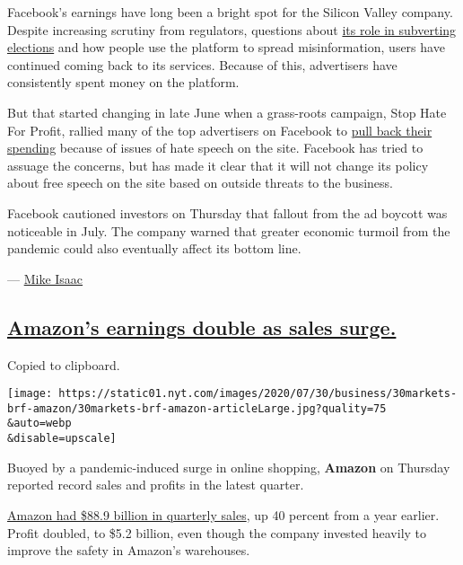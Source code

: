 Facebook's earnings have long been a bright spot for the Silicon Valley
company. Despite increasing scrutiny from regulators, questions about
\href{https://www.nytimes.com/2018/02/17/technology/indictment-russian-tech-facebook.html}{its
role in subverting elections} and how people use the platform to spread
misinformation, users have continued coming back to its services.
Because of this, advertisers have consistently spent money on the
platform.

But that started changing in late June when a grass-roots campaign, Stop
Hate For Profit, rallied many of the top advertisers on Facebook to
\href{https://www.nytimes.com/2020/06/30/technology/facebook-advertising-boycott.html}{pull
back their spending} because of issues of hate speech on the site.
Facebook has tried to assuage the concerns, but has made it clear that
it will not change its policy about free speech on the site based on
outside threats to the business.

Facebook cautioned investors on Thursday that fallout from the ad
boycott was noticeable in July. The company warned that greater economic
turmoil from the pandemic could also eventually affect its bottom line.

--- \href{https://www.nytimes.com/by/mike-isaac}{Mike Isaac}

\hypertarget{amazons-earnings-double-as-sales-surge}{%
\subsection{\texorpdfstring{\protect\hyperlink{amazons-earnings-double-as-sales-surge}{Amazon's
earnings double as sales
surge.}}{Amazon's earnings double as sales surge.}}\label{amazons-earnings-double-as-sales-surge}}

Copied to clipboard.

\texttt{[image: https://static01.nyt.com/images/2020/07/30/business/30markets-brf-amazon/30markets-brf-amazon-articleLarge.jpg?quality=75\\\&auto=webp\\\&disable=upscale]}

Buoyed by a pandemic-induced surge in online shopping, \textbf{Amazon}
on Thursday reported record sales and profits in the latest quarter.

\href{https://www.nytimes.com/2020/05/22/technology/amazon-coronavirus-target-walmart.html}{Amazon
had \$88.9 billion in quarterly sales}, up 40 percent from a year
earlier. Profit doubled, to \$5.2 billion, even though the company
invested heavily to improve the safety in Amazon's warehouses.

